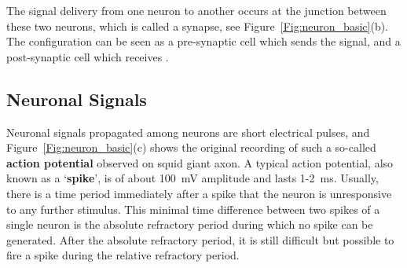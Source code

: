 The signal delivery from one neuron to another occurs at the junction between these two neurons, which is called a synapse, see Figure~\ref{Fig:neuron_basic}(b).
The configuration can be seen as a pre-synaptic cell which sends the signal, and a post-synaptic cell which receives \DIFaddbegin {}\DIFaddend .

%


\subsection{Neuronal Signals}
Neuronal signals propagated among neurons are short electrical pulses, and Figure~\ref{Fig:neuron_basic}(c) shows the original recording of such a so-called \textbf{action potential} observed on \DIFdelbegin {}\DIFdelend \DIFaddbegin {}\DIFaddend squid giant axon.
A typical action potential, also known as a `\textbf{spike}', is of about 100~mV amplitude and lasts 1-2~ms.
Usually, there is a time period immediately after a spike that the neuron is unresponsive to any further stimulus.
This minimal time difference between two spikes of a single neuron is the absolute refractory period during which no spike can be generated.
After the absolute refractory period, it is still difficult but possible to 
fire a spike during the relative refractory period.

